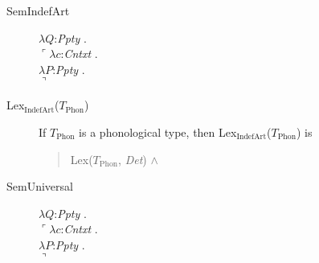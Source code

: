 \begin{description}
  
\item[\textnormal{SemIndefArt}] \mbox{}


$\lambda Q$:\textit{Ppty} . \\
  \hspace*{1em}$\ulcorner\lambda c$:\textit{Cntxt} . \\
  \hspace*{2em}$\lambda P$:\textit{Ppty} . \\
  \hspace*{3em}$\urcorner$



 

        
      \item[\textnormal{Lex$_{\mathrm{IndefArt}}$($T_{\mathrm{Phon}}$)}]
        \mbox{}

        If $T_{\mathrm{Phon}}$ is a phonological type, then
        Lex$_{\mathrm{IndefArt}}$($T_{\mathrm{Phon}}$) is
        \begin{quote}
          Lex($T_{\mathrm{Phon}}$, \textit{Det}) \d{$\wedge$}
        \end{quote}

        
      \item[\textnormal{SemUniversal}] \mbox{}

               $\lambda Q$:\textit{Ppty} . \\
  \hspace*{1em}$\ulcorner\lambda c$:\textit{Cntxt} . \\
  \hspace*{2em}$\lambda P$:\textit{Ppty} . \\
  \hspace*{3em}$\urcorner$


\end{description}
